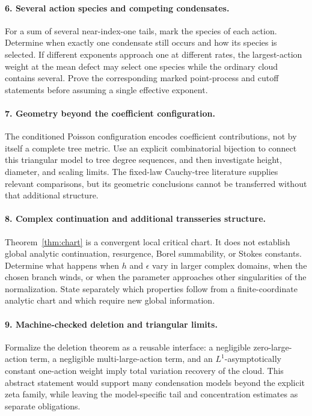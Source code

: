 \documentclass[11pt,a4paper]{article}
\numberwithin{equation}{section}
\theoremstyle{definition}
\theoremstyle{remark}
\newcommand{\ee}{\epsilon}
\begin{document}
\paragraph{6. Several action species and competing condensates.}
For a sum of several near-index-one tails, mark the species of each action.
Determine when exactly one condensate still occurs and how its species is
selected. If different exponents approach one at different rates, the
largest-action weight at the mean defect may select one species while the
ordinary cloud contains several. Prove the corresponding marked
point-process and cutoff statements before assuming a single effective
exponent.

\paragraph{7. Geometry beyond the coefficient configuration.}
The conditioned Poisson configuration encodes coefficient contributions,
not by itself a complete tree metric. Use an explicit combinatorial
bijection to connect this triangular model to tree degree sequences, and
then investigate height, diameter, and scaling limits. The fixed-law
Cauchy-tree literature \cite{kr} supplies relevant comparisons, but its
geometric conclusions cannot be transferred without that additional
structure.

\paragraph{8. Complex continuation and additional transseries structure.}
Theorem~\ref{thm:chart} is a convergent local critical chart. It does not
establish global analytic continuation, resurgence, Borel summability, or
Stokes constants. Determine what happens when $h$ and $\ee$ vary in larger
complex domains, when the chosen branch winds, or when the parameter
approaches other singularities of the normalization. State separately
which properties follow from a finite-coordinate analytic chart and
which require new global information.

\paragraph{9. Machine-checked deletion and triangular limits.}
Formalize the deletion theorem as a reusable interface: a negligible
zero-large-action term, a negligible multi-large-action term, and an
$L^1$-asymptotically constant one-action weight imply total variation
recovery of the cloud. This abstract statement would support many
condensation models beyond the explicit zeta family, while leaving the
model-specific tail and concentration estimates as separate obligations.
\end{document}
